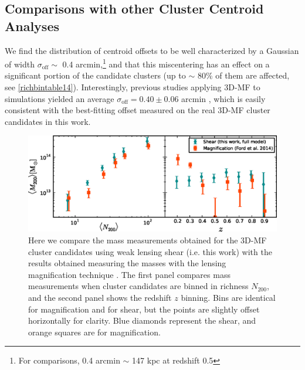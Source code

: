 
\subsection{Comparisons with other Cluster Centroid Analyses}
\label{sec:centers4}
We find the distribution of centroid offsets to be well characterized by a Gaussian of width $\sigma_{\mathrm{off}} \sim$ 0.4 arcmin,\footnote{For comparisons, 0.4 arcmin $\sim$ 147 kpc at redshift 0.5} and that this miscentering has an effect on a significant portion of the candidate clusters (up to $\sim$ 80\% of them are affected, see \autoref{richbintable14}). Interestingly, previous studies applying \ac{3D-MF} to simulations yielded an average $\sigma_{\mathrm{off}}=0.40 \pm 0.06$ arcmin \citep[see Figure 1 in][]{Ford14}, which is easily consistent with the best-fitting offset measured on the real \ac{3D-MF} cluster candidates in this work.

\begin{figure}
\begin{center}
  \includegraphics[scale=0.9]{plots_ch4/shearVSmag_N200_z.eps}
  \caption[Comparison of Magnification and Shear Masses]{Here we compare the mass measurements obtained for the \ac{3D-MF} cluster candidates using weak lensing shear (i.e. this work) with the results obtained measuring the masses with the lensing magnification technique \citep[the $N_{200}$ estimates from that work, ][are used in this plot for the purposes of comparison]{Ford14}. The first panel compares mass measurements when cluster candidates are binned in richness $N_{200}$, and the second panel shows the redshift $z$ binning. Bins are identical for magnification and for shear, but the points are slightly offset horizontally for clarity. Blue diamonds represent the shear, and orange squares are for magnification.}
\label{plot:magshear4}
\end{center}
\end{figure}

